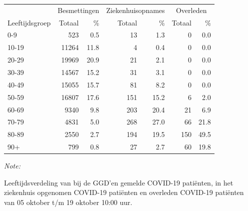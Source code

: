\documentclass[
  english,
  man,floatsintext]{apa6}
\begin{document}
\begin{table}[H]
\centering\begingroup\fontsize{11}{13}\selectfont

\begin{threeparttable}
\begin{tabular}{lrrrrrr}
\toprule
\multicolumn{1}{c}{ } & \multicolumn{2}{c}{Besmettingen} & \multicolumn{2}{c}{Ziekenhuisopnames} & \multicolumn{2}{c}{Overleden} \\
\cmidrule(l{3pt}r{3pt}){2-3} \cmidrule(l{3pt}r{3pt}){4-5} \cmidrule(l{3pt}r{3pt}){6-7}
Leeftijdsgroep & Totaal & \% & Totaal & \% & Totaal & \%\\
\midrule
0-9 & 523 & 0.5 & 13 & 1.3 & 0 & 0.0\\
10-19 & 11264 & 11.8 & 4 & 0.4 & 0 & 0.0\\
20-29 & 19969 & 20.9 & 21 & 2.1 & 0 & 0.0\\
30-39 & 14567 & 15.2 & 31 & 3.1 & 0 & 0.0\\
40-49 & 15055 & 15.7 & 81 & 8.2 & 0 & 0.0\\
50-59 & 16807 & 17.6 & 151 & 15.2 & 6 & 2.0\\
60-69 & 9340 & 9.8 & 203 & 20.4 & 21 & 6.9\\
70-79 & 4831 & 5.0 & 268 & 27.0 & 66 & 21.8\\
80-89 & 2550 & 2.7 & 194 & 19.5 & 150 & 49.5\\
90+ & 799 & 0.8 & 27 & 2.7 & 60 & 19.8\\
\bottomrule
\end{tabular}
\begin{tablenotes}
\item \textit{Note: } 
\item Leeftijdsverdeling van bij de GGD’en gemelde COVID-19 patiënten, in het ziekenhuis opgenomen COVID-19 patiënten en overleden COVID-19 patiënten van 05 oktober t/m 19 oktober 10:00 uur.
\end{tablenotes}
\end{threeparttable}
\endgroup{}
\end{table}
\end{document}
